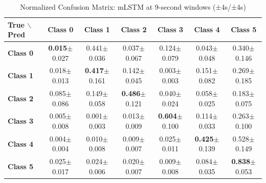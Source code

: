\begin{table}[htbp]
\centering
\caption{Normalized Confusion Matrix: mLSTM at 9-second windows (±4s/±4s)}
\label{tab:app_cm_mlstm_9s}
\small
\setlength{\tabcolsep}{2pt}
\begin{tabular}{lcccccc}
	\toprule
	\textbf{True $\backslash$ Pred} & \textbf{Class 0} & \textbf{Class 1} & \textbf{Class 2} & \textbf{Class 3} & \textbf{Class 4} & \textbf{Class 5} \\
\midrule
	\textbf{Class 0} & \textbf{0.015}$\pm$0.027 & 0.441$\pm$0.036 & 0.037$\pm$0.067 & 0.124$\pm$0.079 & 0.043$\pm$0.048 & 0.340$\pm$0.146 \\
	\textbf{Class 1} & 0.018$\pm$0.013 & \textbf{0.417}$\pm$0.161 & 0.142$\pm$0.045 & 0.003$\pm$0.003 & 0.151$\pm$0.082 & 0.269$\pm$0.185 \\
	\textbf{Class 2} & 0.085$\pm$0.086 & 0.149$\pm$0.058 & \textbf{0.486}$\pm$0.121 & 0.040$\pm$0.024 & 0.058$\pm$0.025 & 0.183$\pm$0.075 \\
	\textbf{Class 3} & 0.005$\pm$0.008 & 0.001$\pm$0.003 & 0.013$\pm$0.009 & \textbf{0.604}$\pm$0.100 & 0.114$\pm$0.033 & 0.263$\pm$0.100 \\
	\textbf{Class 4} & 0.004$\pm$0.004 & 0.010$\pm$0.008 & 0.009$\pm$0.007 & 0.025$\pm$0.011 & \textbf{0.425}$\pm$0.139 & 0.528$\pm$0.149 \\
	\textbf{Class 5} & 0.025$\pm$0.017 & 0.024$\pm$0.006 & 0.020$\pm$0.007 & 0.009$\pm$0.008 & 0.084$\pm$0.035 & \textbf{0.838}$\pm$0.053 \\
\bottomrule
\end{tabular}
\setlength{\tabcolsep}{6pt}
\end{table}

